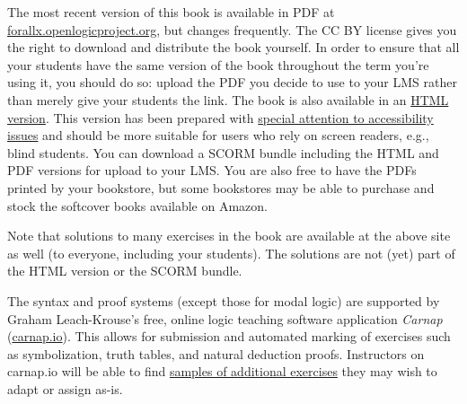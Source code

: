 The most recent version of this book is available in PDF at
\href{https://forallx.openlogicproject.org}{forallx.openlogicproject.org},
but changes frequently.  The CC BY license gives you the right to
download and distribute the book yourself. In order to ensure that all
your students have the same version of the book throughout the term
you're using it, you should do so: upload the PDF you decide to use to
your LMS rather than merely give your students the link. The book is
also available in an
\href{https://forallx.openlogicproject.org/html/}{HTML version}. This
version has been prepared with
\href{https://forallx.openlogicproject.org/html/A4.html}{special
attention to accessibility issues} and should be more suitable for
users who rely on screen readers, e.g., blind students. You can
download a SCORM bundle including the HTML and PDF versions for upload
to your LMS. You are also free to have the PDFs printed by your
bookstore, but some bookstores may be able to purchase and stock the
softcover books available on Amazon.

Note that solutions to many exercises in the book are available at the
above site as well (to everyone, including your students). The
solutions are not (yet) part of the HTML version or the SCORM bundle.

The syntax and proof systems (except those for modal logic) are supported by Graham Leach-Krouse's free, online logic teaching software application \textit{Carnap} (\href{https://carnap.io}{carnap.io}). This allows for submission and automated marking of exercises such as symbolization, truth tables, and natural deduction proofs.  Instructors on carnap.io will be able to find \href{https://carnap.io/shared/rzach@ucalgary.ca/forall%20x:%20Calgary.md}{samples of additional exercises} they may wish to adapt or assign as-is.